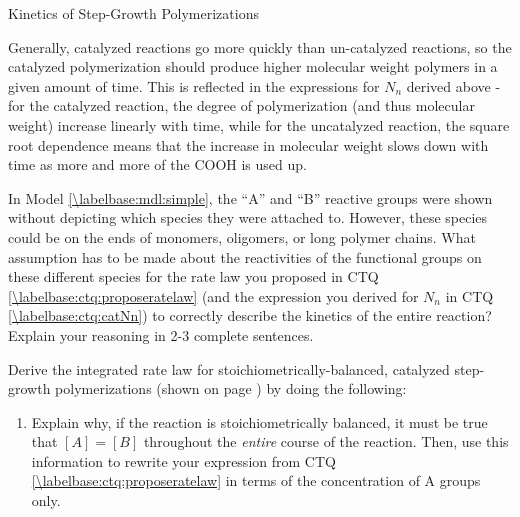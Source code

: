\begin{activity}{Kinetics of Step-Growth Polymerizations}
\begin{ctqs}
		\begin{solution}[2in]
		
			Generally, catalyzed reactions go more quickly than un-catalyzed reactions, so the catalyzed polymerization should produce higher molecular weight polymers in a given amount of time.  This is reflected in the expressions for $N_n$ derived above - for the catalyzed reaction, the degree of polymerization (and thus molecular weight) increase linearly with time, while for the uncatalyzed reaction, the square root dependence means that the increase in molecular weight slows down with time as more and more of the COOH is used up.
		\end{solution}

\end{ctqs}
	

\begin{exercises}

		\exercise In Model \ref{\labelbase:mdl:simple}, the ``A'' and ``B'' reactive groups were shown without depicting which species they were attached to.  However, these species could be on the ends of monomers, oligomers, or long polymer chains. %
		What assumption has to be made about the reactivities of the functional groups on these different species for the rate law you proposed in CTQ \ref{\labelbase:ctq:proposeratelaw} (and the expression you derived for $N_n$ in CTQ \ref{\labelbase:ctq:catNn}) to correctly describe the kinetics of the entire reaction?  Explain your reasoning in 2-3 complete sentences.
		
			\begin{solution}\end{solution}
			
		\exercise Derive the integrated rate law for stoichiometrically-balanced, catalyzed step-growth polymerizations (shown on page \pageref{\labelbase:infobox:catintegrated}) by doing the following: \label{\labelbase:exc:catinteratelaw}
		
			\begin{enumerate}
				\item Explain why, if the reaction is stoichiometrically balanced, it must be true that $[A]=[B]$ throughout the \emph{entire} course of the reaction.  Then, use this information to rewrite your expression from CTQ \ref{\labelbase:ctq:proposeratelaw} in terms of the concentration of A groups only.
				

\end{enumerate}
\end{exercises}
\end{activity}
